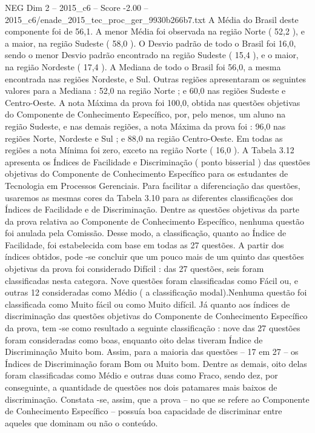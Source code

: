 \begin{textsample}{NEG Dim 2 – 2015\_c6 – Score -2.00 – 2015\_c6/enade\_2015\_tec\_proc\_ger\_9930b266b7.txt}
A Média do Brasil deste componente foi de 56,1.
A menor Média foi observada na região Norte ( 52,2 ), e a maior, na região Sudeste ( 58,0 ).
O Desvio padrão de todo o Brasil foi 16,0, sendo o menor Desvio padrão encontrado na região Sudeste ( 15,4 ), e o maior, na região Nordeste ( 17,4 ).
A Mediana de todo o Brasil foi 56,0, a mesma encontrada nas regiões Nordeste, e Sul.
Outras regiões apresentaram os seguintes valores para a Mediana : 52,0 na região Norte ; e 60,0 nas regiões Sudeste e Centro-Oeste.
A nota Máxima da prova foi 100,0, obtida nas questões objetivas do Componente de Conhecimento Específico, por, pelo menos, um aluno na região Sudeste, e nas demais regiões, a nota Máxima da prova foi : 96,0 nas regiões Norte, Nordeste e Sul ; e 88,0 na região Centro-Oeste.
Em todas as regiões a nota Mínima foi zero, exceto na região Norte ( 16,0 ).
A Tabela 3.12 apresenta os Índices de Facilidade e Discriminação ( ponto bisserial ) das questões objetivas do Componente de Conhecimento Específico para os estudantes de Tecnologia em Processos Gerenciais.
Para facilitar a diferenciação das questões, usaremos as mesmas cores da Tabela 3.10 para as diferentes classificações dos Índices de Facilidade e de Discriminação.
Dentre as questões objetivas da parte da prova relativa ao Componente de Conhecimento Específico, nenhuma questão foi anulada pela Comissão.
Desse modo, a classificação, quanto ao Índice de Facilidade, foi estabelecida com base em todas as 27 questões.
A partir dos índices obtidos, pode -se concluir que um pouco mais de um quinto das questões objetivas da prova foi considerado Difícil : das 27 questões, seis foram classificadas nesta categora.
Nove questões foram classificadas como Fácil ou, e outras 12 consideradas como Médio ( a classificação modal).Nenhuma questão foi classificada como Muito fácil ou como Muito difícil.
Já quanto aos índices de discriminação das questões objetivas do Componente de Conhecimento Específico da prova, tem -se como resultado a seguinte classificação : nove das 27 questões foram consideradas como boas, enquanto oito delas tiveram Índice de Discriminação Muito bom.
Assim, para a maioria das questões – 17 em 27 – os Índices de Discriminação foram Bom ou Muito bom.
Dentre as demais, oito delas foram classificadas como Médio e outras duas como Fraco, sendo dez, por conseguinte, a quantidade de questões nos dois patamares mais baixos de discriminação.
Constata -se, assim, que a prova – no que se refere ao Componente de Conhecimento Específico – possuía boa capacidade de discriminar entre aqueles que dominam ou não o conteúdo.

\end{textsample}
